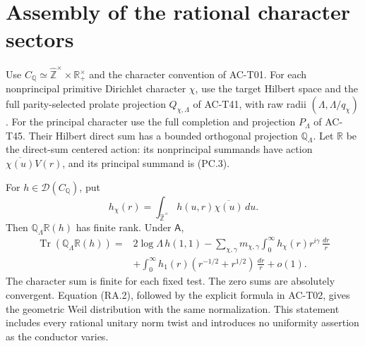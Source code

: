 \section{Assembly of the rational character sectors}

\begin{corollary}
\label{AC-T46}
Use \(C_{\mathbb Q}\simeq
\widehat{\mathbb Z}^{\times}\times\mathbb R_+^\times\)
and the character convention of AC-T01.
For each nonprincipal primitive Dirichlet character
\(\chi\), use the target Hilbert space and the
full parity-selected prolate projection
\(Q_{\chi,\Lambda}\) of AC-T41, with
raw radii \((\Lambda,\Lambda/q_\chi)\).
For the principal character use the full completion
and projection \(P_\Lambda\) of AC-T45.
Their Hilbert direct sum has a bounded orthogonal
projection \(\mathbb Q_\Lambda\).
Let \(\mathbb R\) be the direct-sum centered action:
its nonprincipal summands have action
\(\overline{\chi(u)}V(r)\), and its principal
summand is (PC.3).

For \(h\in\mathcal D(C_{\mathbb Q})\), put
\[
 h_\chi(r)=\int_{\widehat{\mathbb Z}^{\times}}
                  h(u,r)\overline{\chi(u)}\,du .
 \tag{RA.1}
\]
Then \(\mathbb Q_\Lambda\mathbb R(h)\) has finite
rank.  Under \(\mathsf A\),
\[
 \begin{split}
 \operatorname{Tr}(\mathbb Q_\Lambda\mathbb R(h))
 ={}&2\log\Lambda\,h(1,1)
    -\sum_{\chi,\gamma}m_{\chi,\gamma}
               \int_0^\infty h_\chi(r)r^{i\gamma}\,\frac{dr}{r}\\
   &+\int_0^\infty h_1(r)
                    (r^{-1/2}+r^{1/2})\,\frac{dr}{r}
     +o(1).
 \end{split}
 \tag{RA.2}
\]
The character sum is finite for each fixed test.
The zero sums are absolutely convergent.
Equation (RA.2), followed by the explicit formula
in AC-T02, gives the geometric Weil distribution
with the same normalization.
This statement includes every rational unitary
norm twist and introduces no uniformity assertion
as the conductor varies.
\end{corollary}
